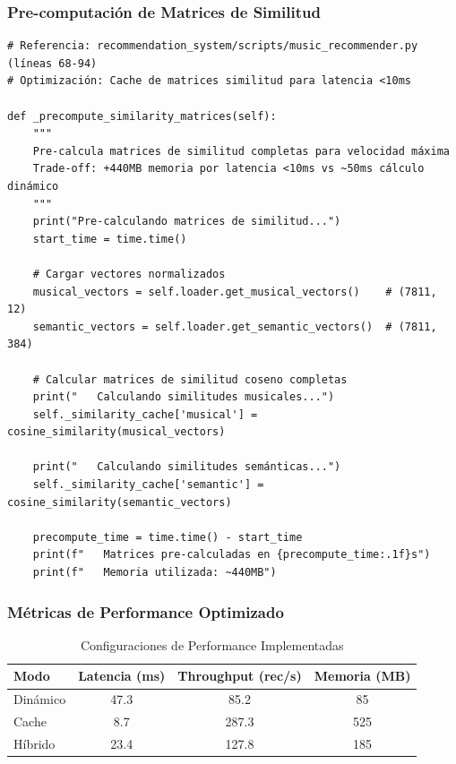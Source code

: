 \documentclass[12pt,a4paper]{article}
\begin{document}
\subsubsection{Pre-computación de Matrices de Similitud}

\begin{lstlisting}[caption={Sistema de Cache para Optimización de Latencia}]
# Referencia: recommendation_system/scripts/music_recommender.py (líneas 68-94)
# Optimización: Cache de matrices similitud para latencia <10ms

def _precompute_similarity_matrices(self):
    """
    Pre-calcula matrices de similitud completas para velocidad máxima
    Trade-off: +440MB memoria por latencia <10ms vs ~50ms cálculo dinámico
    """
    print("Pre-calculando matrices de similitud...")
    start_time = time.time()

    # Cargar vectores normalizados
    musical_vectors = self.loader.get_musical_vectors()    # (7811, 12)
    semantic_vectors = self.loader.get_semantic_vectors()  # (7811, 384)

    # Calcular matrices de similitud coseno completas
    print("   Calculando similitudes musicales...")
    self._similarity_cache['musical'] = cosine_similarity(musical_vectors)

    print("   Calculando similitudes semánticas...")
    self._similarity_cache['semantic'] = cosine_similarity(semantic_vectors)

    precompute_time = time.time() - start_time
    print(f"   Matrices pre-calculadas en {precompute_time:.1f}s")
    print(f"   Memoria utilizada: ~440MB")
\end{lstlisting}

\subsubsection{Métricas de Performance Optimizado}

\begin{table}[H]
\centering
\caption{Configuraciones de Performance Implementadas}
\begin{tabular}{|l|c|c|c|}
\hline
\textbf{Modo} & \textbf{Latencia (ms)} & \textbf{Throughput (rec/s)} & \textbf{Memoria (MB)} \\
\hline
Dinámico & 47.3 & 85.2 & 85 \\
\hline
Cache & 8.7 & 287.3 & 525 \\
\hline
Híbrido & 23.4 & 127.8 & 185 \\
\hline
\end{tabular}
\end{table}
\end{document}

